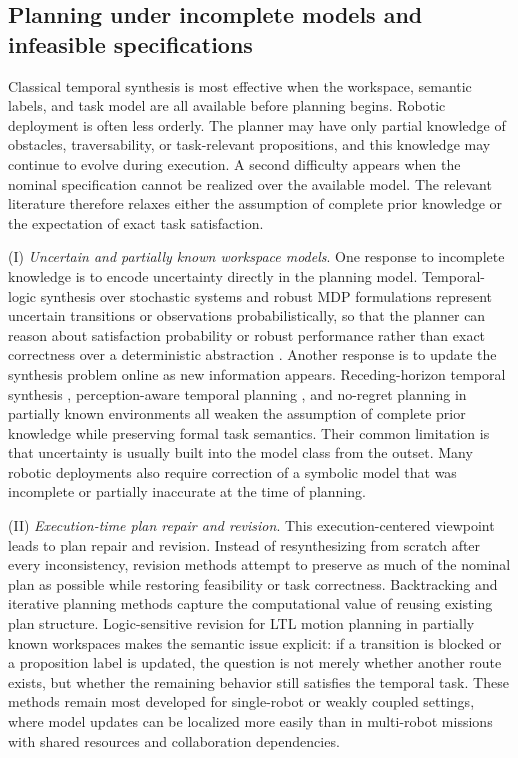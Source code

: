 \subsection{Planning under incomplete models and infeasible specifications}
\label{sec:ch01:rw:incomplete}

Classical temporal synthesis is most effective when the workspace, semantic labels, and
task model are all available before planning begins. Robotic deployment is often less
orderly. The planner may have only partial knowledge of obstacles, traversability, or
task-relevant propositions, and this knowledge may continue to evolve during execution. A
second difficulty appears when the nominal specification cannot be realized over the
available model. The relevant literature therefore relaxes either the assumption of
complete prior knowledge or the expectation of exact task satisfaction.

 (I) \emph{Uncertain and partially known workspace models}. One response to
incomplete knowledge is to encode uncertainty directly in the planning model.
Temporal-logic synthesis over stochastic systems and robust MDP formulations represent
uncertain transitions or observations probabilistically, so that the planner can reason
about satisfaction probability or robust performance rather than exact correctness over a
deterministic abstraction \citep{ding2011mdp, wolff2012robust}. Another response is to
update the synthesis problem online as new information appears. Receding-horizon temporal
synthesis \citep{wongpiromsarn2010receding}, perception-aware temporal planning
\citep{kantaros2022perception}, and no-regret planning in partially known environments
\citep{zhao2025noregret} all weaken the assumption of complete prior knowledge while
preserving formal task semantics. Their common limitation is that uncertainty is usually
built into the model class from the outset. Many robotic deployments also require
correction of a symbolic model that was incomplete or partially inaccurate at the time of
planning.

 (II) \emph{Execution-time plan repair and revision}. This execution-centered
viewpoint leads to plan repair and revision. Instead of resynthesizing from scratch after
every inconsistency, revision methods attempt to preserve as much of the nominal plan as
possible while restoring feasibility or task correctness. Backtracking and iterative
planning methods \citep{livingston2012backtracking, maly2013iterative} capture the
computational value of reusing existing plan structure. Logic-sensitive revision for LTL
motion planning in partially known workspaces \citep{guo2013revising} makes the semantic
issue explicit: if a transition is blocked or a proposition label is updated, the question
is not merely whether another route exists, but whether the remaining behavior still
satisfies the temporal task. These methods remain most developed for single-robot or
weakly coupled settings, where model updates can be localized more easily than in
multi-robot missions with shared resources and collaboration dependencies.

